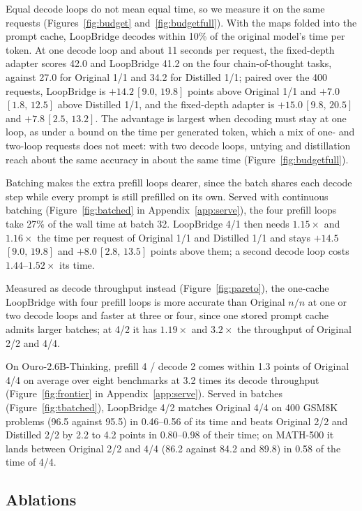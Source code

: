 \documentclass[11pt]{article}
\newcommand{\ci}[2]{\,{\scriptsize\ensuremath{[#1,\,#2]}}}
\begin{document}
Equal decode loops do not mean equal time, so we measure it on the same requests (Figures~\ref{fig:budget}
and~\ref{fig:budgetfull}). With the
maps folded into the prompt cache, LoopBridge decodes within 10\% of the original model's time per token. At one decode
loop and about 11 seconds per request, the fixed-depth adapter scores 42.0 and LoopBridge 41.2 on the four
chain-of-thought tasks, against 27.0 for Original 1/1 and 34.2 for Distilled 1/1; paired over the 400 requests,
LoopBridge is $+14.2$\ci{9.0}{19.8} points above Original 1/1 and $+7.0$\ci{1.8}{12.5} above Distilled 1/1, and the
fixed-depth adapter is $+15.0$\ci{9.8}{20.5} and $+7.8$\ci{2.5}{13.2}. The advantage is largest when decoding must stay
at one loop, as under a bound on the time per generated token, which a mix of one- and two-loop requests does not meet:
with two decode loops, untying and distillation reach about the same accuracy in about the same time
(Figure~\ref{fig:budgetfull}).

Batching makes the extra prefill loops dearer, since the batch shares each decode step while every prompt is still
prefilled on its own. Served with continuous batching (Figure~\ref{fig:batched} in Appendix~\ref{app:serve}), the four
prefill loops take 27\% of the wall time at batch 32. LoopBridge 4/1 then needs $1.15\times$ and $1.16\times$ the time
per request of Original 1/1 and Distilled 1/1 and stays $+14.5$\ci{9.0}{19.8} and $+8.0$\ci{2.8}{13.5} points above
them; a second decode loop costs $1.44$--$1.52\times$ its time.

Measured as decode throughput instead (Figure~\ref{fig:pareto}), the one-cache LoopBridge with four prefill loops is
more accurate than Original $n/n$ at one or two decode loops and faster at three or four, since one stored prompt cache
admits larger batches; at 4/2 it has $1.19\times$ and $3.2\times$ the throughput of Original 2/2 and 4/4.

On Ouro-2.6B-Thinking, prefill 4 / decode 2 comes within 1.3 points of Original 4/4 on average over eight benchmarks
at 3.2 times its decode throughput (Figure~\ref{fig:frontier} in Appendix~\ref{app:serve}). Served in batches
(Figure~\ref{fig:tbatched}), LoopBridge 4/2 matches Original 4/4 on 400 GSM8K problems (96.5 against 95.5) in
0.46--0.56 of its time and beats Original 2/2 and Distilled 2/2 by 2.2 to 4.2 points in 0.80--0.98 of their time; on
MATH-500 it lands between Original 2/2 and 4/4 (86.2 against 84.2 and 89.8) in 0.58 of the time of 4/4.


\subsection{Ablations}
\label{sec:ablate}
\end{document}
